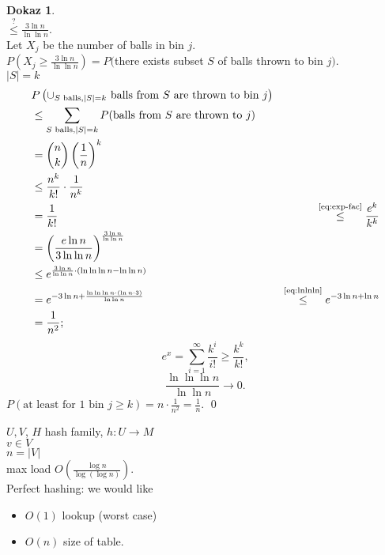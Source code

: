 \documentclass[a4paper, 12pt]{book}
\theoremstyle{definition}
\newtheorem{pro}[counter]{Dokaz}
\theoremstyle{remark}
\begin{document}
\begin{pro} \text{} \\
  $\stackrel{?}{\leq} \frac{3 \ln n}{\ln \ln n}$. \\
  Let $X_j$ be the number of balls in bin $j$. \\
  $P\left(X_j \geq \frac{3 \ln n}{\ln \ln n}\right) = P($there exists subset $S$ of balls thrown to bin $j)$. \\
  $|S| = k$
  \begin{align*}
    &P\left(\cup_{S \text{ balls}, |S|=k} \text{ balls from $S$ are thrown to bin }j\right) \\
    &\leq \sum_{S \text{ balls}, |S|=k} P(\text{balls from $S$ are thrown to }j) \\
    &= \binom{n}{k} \left(\frac{1}{n}\right)^k \\
    &\leq \frac{n^k}{k!} \cdot \frac{1}{n^k} \\
    &= \frac{1}{k!}
    &\stackrel{\refeq{eq:exp-fac}}{\leq} \frac{e^k}{k^k} \\
    &= \left(\frac{e \ln n}{3 \ln \ln n}\right)^{\frac{3 \ln n}{\ln \ln n}} \\
    &\leq e^{\frac{3 \ln n}{\ln \ln n} \cdot \left(\ln \ln \ln n - \ln \ln n\right)} \\
    &= e^{-3 \ln n + \frac{\ln \ln \ln n \cdot (\ln n \cdot 3)}{\ln \ln n}}
    &\stackrel{\refeq{eq:lnlnln}}{\leq} e^{-3 \ln n + \ln n} \\
    &= \frac{1}{n^2};
  \end{align*}
  \begin{equation}
    \label{eq:exp-fac}
    e^x = \sum_{i=1}^{\infty} \frac{k^i}{i!} \geq \frac{k^k}{k!},
  \end{equation}
  \begin{equation}
    \label{eq:lnlnln}
    \frac{\ln \ln \ln n}{\ln \ln n} \to 0.
  \end{equation}
  $P(\text{at least for $1$ bin }j \geq k) = n \cdot \frac{1}{n^2} = \frac{1}{n}$.
  \qed
\end{pro}



$U, V$, $H$ hash family, $h: U \to M$ \\
$v \in V$ \\
$n = |V|$ \\
max load $O\left(\frac{\log n}{\log (\log n)}\right)$. \\
Perfect hashing: we would like
\begin{itemize}
  \item $O(1)$ lookup (worst case)
  \item $O(n)$ size of table.
\end{itemize}
\end{document}
